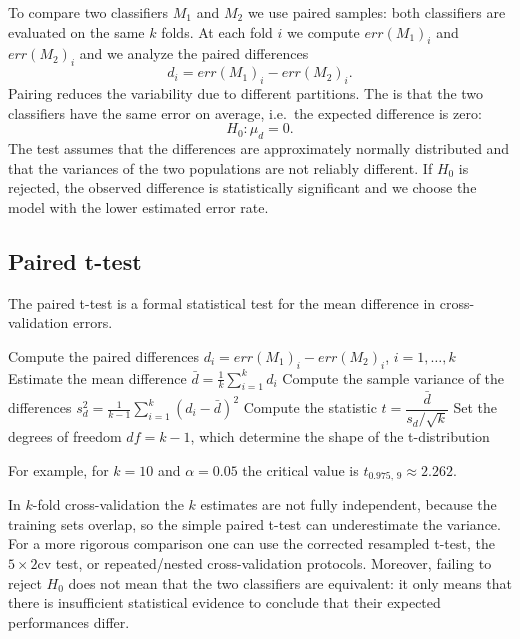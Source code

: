 To compare two classifiers $M_1$ and $M_2$ we use paired samples: both classifiers are evaluated on the same $k$ folds. At each fold $i$ we compute $err(M_1)_i$ and $err(M_2)_i$ and we analyze the paired differences
\[
  d_i = err(M_1)_i - err(M_2)_i.
\]
Pairing reduces the variability due to different partitions. The  is that the two classifiers have the same error on average, i.e.\ the expected difference is zero:
\[
  H_0: \mu_d = 0.
\]
The test assumes that the differences are approximately normally distributed and that the variances of the two populations are not reliably different. If $H_0$ is rejected, the observed difference is statistically significant and we choose the model with the lower estimated error rate.

\subsection{Paired t-test}

The paired t-test is a formal statistical test for the mean difference in cross-validation errors.

\begin{algorithm}[H]
\caption{Paired t-test}
Compute the paired differences $d_i = err(M_1)_i - err(M_2)_i$, $i = 1,\dots,k$\;
Estimate the mean difference $\bar d = \frac{1}{k}\sum_{i=1}^{k} d_i$\;
Compute the sample variance of the differences $s_d^2 = \frac{1}{k-1}\sum_{i=1}^{k} (d_i - \bar d)^2$\;
Compute the statistic $t = \dfrac{\bar d}{s_d / \sqrt{k}}$\;
Set the degrees of freedom $df = k-1$, which determine the shape of the t-distribution\;
\end{algorithm}

For example, for $k = 10$ and $\alpha = 0.05$ the critical value is $t_{0.975,\,9} \approx 2.262$.

\begin{remark}
In $k$-fold cross-validation the $k$ estimates are not fully independent, because the training sets overlap, so the simple paired t-test can underestimate the variance. For a more rigorous comparison one can use the corrected resampled t-test, the $5\times 2$cv test, or repeated/nested cross-validation protocols. Moreover, failing to reject $H_0$ does not mean that the two classifiers are equivalent: it only means that there is insufficient statistical evidence to conclude that their expected performances differ.
\end{remark}
